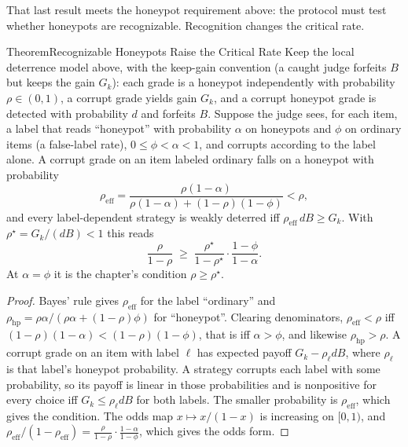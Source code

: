That last result meets the honeypot requirement above: the protocol must test
whether honeypots are recognizable. Recognition changes the critical rate.

\begin{pdclaim}{Theorem}{Recognizable Honeypots Raise the Critical Rate}
\setlength{\parskip}{4pt plus 1pt}
\label{thm:stp-honeypot-recognition}
Keep the local deterrence model above, with the keep-gain convention (a
caught judge forfeits $B$ but keeps the gain $G_k$): each
grade is a honeypot independently with probability $\rho\in(0,1)$, a corrupt
grade yields gain $G_k$, and a corrupt honeypot grade is detected with
probability $d$ and forfeits $B$. Suppose the judge sees, for each item, a
label that reads ``honeypot'' with probability $\alpha$ on honeypots and $\phi$
on ordinary items (a false-label rate), $0\le\phi<\alpha<1$, and corrupts according to the label
alone. A corrupt grade on an item labeled ordinary falls on a honeypot with
probability
\[
\rho_{\mathrm{eff}}=\frac{\rho(1-\alpha)}{\rho(1-\alpha)+(1-\rho)(1-\phi)}<\rho ,
\]
and every label-dependent strategy is weakly deterred iff
$\rho_{\mathrm{eff}}\,dB\ge G_k$. With $\rho^\star=G_k/(dB)<1$ this reads
\[
\frac{\rho}{1-\rho}\;\ge\;\frac{\rho^\star}{1-\rho^\star}\cdot\frac{1-\phi}{1-\alpha}.
\]
At $\alpha=\phi$ it is the chapter's condition $\rho\ge\rho^\star$.
\end{pdclaim}

\begin{proof}
Bayes' rule gives $\rho_{\mathrm{eff}}$ for the label ``ordinary'' and
$\rho_{\mathrm{hp}}=\rho\alpha/(\rho\alpha+(1-\rho)\phi)$ for ``honeypot''.
Clearing denominators, $\rho_{\mathrm{eff}}<\rho$ iff
$(1-\rho)(1-\alpha)<(1-\rho)(1-\phi)$, that is iff $\alpha>\phi$, and
likewise $\rho_{\mathrm{hp}}>\rho$. A corrupt grade on an item with label
$\ell$ has expected payoff $G_k-\rho_\ell dB$, where $\rho_\ell$ is that label's
honeypot probability. A strategy corrupts each label with some probability,
so its payoff is linear in those probabilities and is nonpositive for every
choice iff $G_k\le \rho_\ell dB$ for both labels. The smaller probability is
$\rho_{\mathrm{eff}}$, which gives the condition. The odds map
$x\mapsto x/(1-x)$ is increasing on $[0,1)$, and
$\rho_{\mathrm{eff}}/(1-\rho_{\mathrm{eff}})
=\tfrac{\rho}{1-\rho}\cdot\tfrac{1-\alpha}{1-\phi}$, which gives the odds form.
\end{proof}

